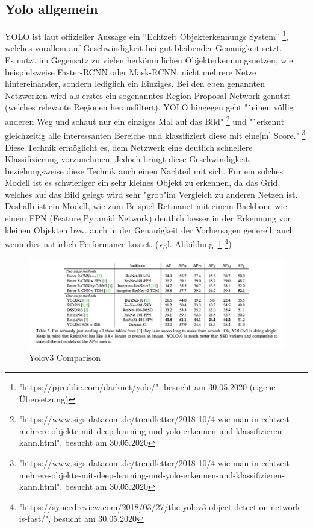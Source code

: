 \documentclass[a4paper,oneside,12pt]{report}
\begin{document}
\begin{onehalfspace}
		\subsection{Yolo allgemein}
		YOLO ist laut offizieller Aussage ein "`Echtzeit Objekterkennungs System"'
		\footnote{"https://pjreddie.com/darknet/yolo/", besucht am 30.05.2020 (eigene Übersetzung)},
		welches vorallem auf Geschwindigkeit bei gut bleibender Genauigkeit setzt.\\
		Es nutzt im Gegensatz zu vielen herkömmlichen Objekterkennungsnetzen, wie beispielsweise Faster-RCNN oder Mask-RCNN, nicht mehrere Netze hintereinander, sondern lediglich ein Einziges. Bei den eben genannten Netzwerken wird als erstes ein sogenanntes Region Proposal Network genutzt (welches relevante Regionen herausfiltert). YOLO hingegen geht "`einen völlig anderen Weg und schaut nur ein einziges Mal auf das Bild"
		\footnote{"https://www.sigs-datacom.de/trendletter/2018-10/4-wie-man-in-echtzeit-mehrere-objekte-mit-deep-learning-und-yolo-erkennen-und-klassifizieren-kann.html", besucht am 30.05.2020}
		und "`erkennt gleichzeitig alle interessanten Bereiche und klassifiziert diese mit eine[m] Score."
		\footnote{"https://www.sigs-datacom.de/trendletter/2018-10/4-wie-man-in-echtzeit-mehrere-objekte-mit-deep-learning-und-yolo-erkennen-und-klassifizieren-kann.html", besucht am 30.05.2020}\\
		Diese Technik ermöglicht es, dem Netzwerk eine deutlich schnellere Klassifizierung vorzunehmen. 
		Jedoch bringt diese Geschwindigkeit, beziehungsweise diese Technik auch einen Nachteil mit sich. Für ein solches Modell ist es schwieriger ein sehr kleines Objekt zu erkennen, da das Grid, welches auf das Bild gelegt wird sehr "grob"\space im Vergleich zu anderen Netzen ist. \\
		Deshalb ist ein Modell, wie zum Beispiel Retinanet mit einem Backbone wie einem FPN (Feature Pyramid Network) deutlich besser in der Erkennung von kleinen Objekten bzw. auch in der Genauigkeit der Vorhersagen generell, auch wenn dies natürlich Performance kostet. (vgl. Abbildung~\ref{fig:comparison}
		\footnote{"https://syncedreview.com/2018/03/27/the-yolov3-object-detection-network-is-fast/", besucht am 30.05.2020})\\
		\begin{figure}[h!]
			\includegraphics[width=\linewidth]{Comparison.png}
			\caption{Yolov3 Comparison}
			\label{fig:comparison}
		\end{figure}

\end{onehalfspace}
\end{document}
